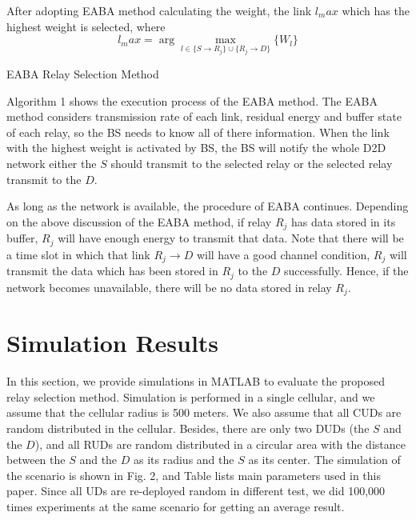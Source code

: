 \documentclass[conference]{IEEEtran}
\begin{document}
After adopting EABA method calculating the weight, the link $l_max$ which has the highest weight is selected, where
\begin{equation}
l_max = \arg \max_{l \in \{S \rightarrow R_j\} \cup \{R_j \rightarrow D\}}\{W_l\}
\end{equation}

\begin{algorithm}[!t]
\caption{EABA Relay Selection Method}
\begin{algorithmic} [1]
\end{algorithmic}
\end{algorithm}

Algorithm 1 shows the execution process of the EABA method. The EABA method considers transmission rate of each link, residual energy and buffer state of each relay, so the BS needs to know all of there information. When the link with the highest weight is activated by BS, the BS will notify the whole D2D network either the $S$ should transmit to the selected relay or the selected relay  transmit to the $D$.

As long as the network is available, the procedure of EABA continues. Depending on the above discussion of the EABA method, if relay $R_j$ has data stored in its buffer, $R_j$ will have enough energy to transmit that data. Note that there will be a time slot in which that link $R_j \rightarrow D$ will have a good channel condition, $R_j$ will transmit the data which has been stored in $R_j$ to the $D$ successfully. Hence, if the network becomes unavailable, there will be no data stored in relay $R_j$.

\section{Simulation Results}
In this section, we provide simulations in MATLAB to evaluate the proposed relay selection method. Simulation is performed in a single cellular, and we assume that the cellular radius is 500 meters. We also assume that all CUDs are random distributed in the cellular. Besides, there are only two DUDs (the $S$ and the $D$), and all RUDs are random distributed in  a circular area with the distance between the $S$ and the $D$ as its radius and the $S$ as its center. The simulation of the scenario is shown in Fig. 2, and Table \uppercase\expandafter{} lists main parameters used in this paper. Since all UDs are re-deployed random in different test, we did 100,000 times experiments at the same scenario for getting an average result.
\end{document}
